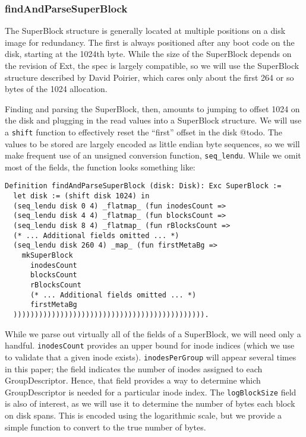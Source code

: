 \documentclass[nocopyrightspace]{sigplanconf}
\begin{document}
\subsubsection{findAndParseSuperBlock}

The SuperBlock structure is generally located at multiple positions on a disk
image for redundancy. The first is always positioned after any boot code on
the disk, starting at the 1024th byte. While the size of the SuperBlock
depends on the revision of Ext, the spec is largely compatible, so we will use
the SuperBlock structure described by David Poirier\cite{non-gnu}, which cares
only about the first 264 or so bytes of the 1024 allocation.

Finding and parsing the SuperBlock, then, amounts to jumping to offset 1024 on
the disk and plugging in the read values into a SuperBlock structure. We will
use a {\tt shift} function to effectively reset the ``first'' offset in the
disk @todo. The values to be stored are largely encoded as little endian byte
sequences, so we will make frequent use of an unsigned conversion function,
{\tt seq\_lendu}. While we omit most of the fields, the function looks
something like:

\begin{lstlisting}
Definition findAndParseSuperBlock (disk: Disk): Exc SuperBlock :=
  let disk := (shift disk 1024) in
  (seq_lendu disk 0 4) _flatmap_ (fun inodesCount =>
  (seq_lendu disk 4 4) _flatmap_ (fun blocksCount =>
  (seq_lendu disk 8 4) _flatmap_ (fun rBlocksCount =>
  (* ... Additional fields omitted ... *)
  (seq_lendu disk 260 4) _map_ (fun firstMetaBg =>
    mkSuperBlock
      inodesCount
      blocksCount
      rBlocksCount
      (* ... Additional fields omitted ... *)
      firstMetaBg
  ))))))))))))))))))))))))))))))))))))))))))))).
\end{lstlisting}

While we parse out virtually all of the fields of a SuperBlock, we will need
only a handful. {\tt inodesCount} provides an upper bound for inode indices
(which we use to validate that a given inode exists). {\tt inodesPerGroup}
will appear several times in this paper; the field indicates the number of
inodes assigned to each GroupDescriptor. Hence, that field provides a way to
determine which GroupDescriptor is needed for a particular inode index. The
{\tt logBlockSize} field is also of interest, as we will use it to determine
the number of bytes each block on disk spans. This is encoded using the
logarithmic scale, but we provide a simple function to convert to the true
number of bytes.
\end{document}
